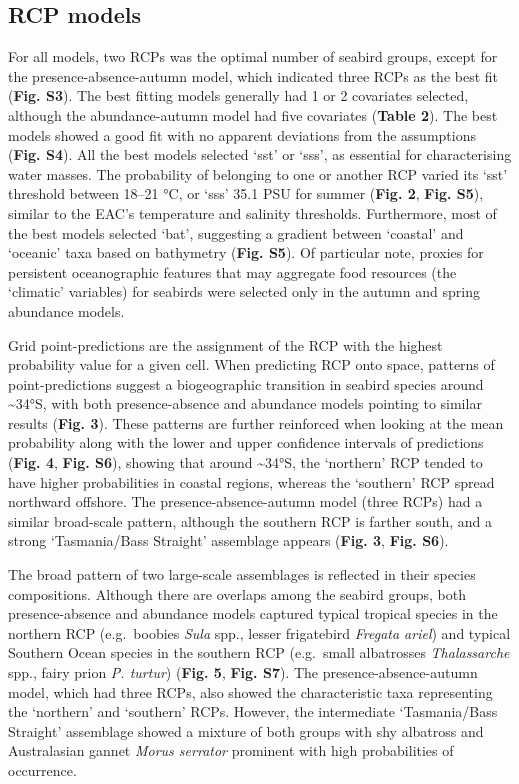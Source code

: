 \documentclass{article}
\begin{document}
\hypertarget{rcp-models}{%
\subsection{RCP models}\label{rcp-models}}

For all models, two RCPs was the optimal number of seabird groups,
except for the presence-absence-autumn model, which indicated three RCPs
as the best fit (\textbf{Fig. S3}). The best fitting models generally
had 1 or 2 covariates selected, although the abundance-autumn model had
five covariates (\textbf{Table 2}). The best models showed a good fit
with no apparent deviations from the assumptions (\textbf{Fig. S4}). All
the best models selected `sst' or `sss', as essential for characterising
water masses. The probability of belonging to one or another RCP varied
its `sst' threshold between 18--21 °C, or `sss' 35.1 PSU for summer
(\textbf{Fig. 2}, \textbf{Fig. S5}), similar to the EAC's temperature
and salinity thresholds. Furthermore, most of the best models selected
`bat', suggesting a gradient between `coastal' and `oceanic' taxa based
on bathymetry (\textbf{Fig. S5}). Of particular note, proxies for
persistent oceanographic features that may aggregate food resources (the
`climatic' variables) for seabirds were selected only in the autumn and
spring abundance models.

Grid point-predictions are the assignment of the RCP with the highest
probability value for a given cell. When predicting RCP onto space,
patterns of point-predictions suggest a biogeographic transition in
seabird species around \textasciitilde34°S, with both presence-absence
and abundance models pointing to similar results (\textbf{Fig. 3}).
These patterns are further reinforced when looking at the mean
probability along with the lower and upper confidence intervals of
predictions (\textbf{Fig. 4}, \textbf{Fig. S6}), showing that around
\textasciitilde34°S, the `northern' RCP tended to have higher
probabilities in coastal regions, whereas the `southern' RCP spread
northward offshore. The presence-absence-autumn model (three RCPs) had a
similar broad-scale pattern, although the southern RCP is farther south,
and a strong `Tasmania/Bass Straight' assemblage appears (\textbf{Fig.
3}, \textbf{Fig. S6}).

The broad pattern of two large-scale assemblages is reflected in their
species compositions. Although there are overlaps among the seabird
groups, both presence-absence and abundance models captured typical
tropical species in the northern RCP (e.g.~boobies \emph{Sula} spp.,
lesser frigatebird \emph{Fregata ariel}) and typical Southern Ocean
species in the southern RCP (e.g.~small albatrosses \emph{Thalassarche}
spp., fairy prion \emph{P. turtur}) (\textbf{Fig. 5}, \textbf{Fig. S7}).
The presence-absence-autumn model, which had three RCPs, also showed the
characteristic taxa representing the `northern' and `southern' RCPs.
However, the intermediate `Tasmania/Bass Straight' assemblage showed a
mixture of both groups with shy albatross and Australasian gannet
\emph{Morus serrator} prominent with high probabilities of occurrence.
\end{document}
